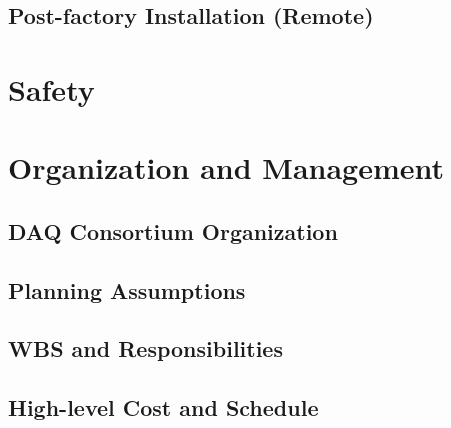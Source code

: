 \subsection{Post-factory Installation (Remote)}
\label{sec:fddp-daq-qc-remote}





\section{Safety}
\label{sec:fddp-daq-safety}






\section{Organization and Management}
\label{sec:fddp-daq-org}

\subsection{DAQ Consortium Organization}
\label{sec:fddp-daq-org-consortium}


\subsection{Planning Assumptions}
\label{sec:fddp-daq-org-assmp}


\subsection{WBS and Responsibilities}
\label{sec:fddp-daq-org-wbs}

\subsection{High-level Cost and Schedule}
\label{sec:fddp-daq-org-cs}














